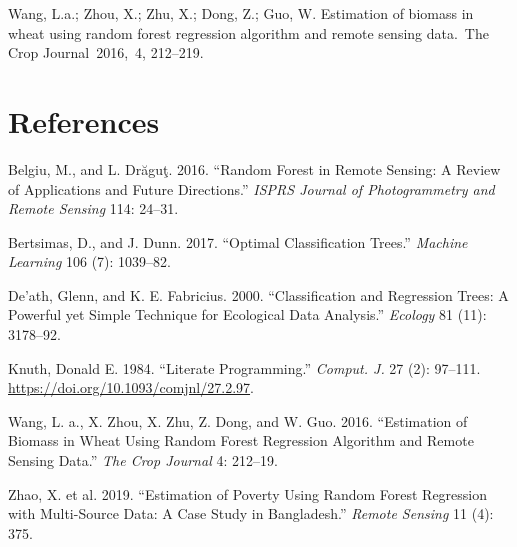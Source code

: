 \documentclass[
  letterpaper,
  DIV=11,
  numbers=noendperiod]{scrreprt}
\newlength{\cslhangindent}
\newenvironment{CSLReferences}[2] %
 {\begin{list}{}{%
  \setlength{\itemindent}{0pt}
  \setlength{\leftmargin}{0pt}
  \setlength{\parsep}{0pt}
  \ifodd #1
   \setlength{\leftmargin}{\cslhangindent}
   \setlength{\itemindent}{-1\cslhangindent}
  \fi
  \setlength{\itemsep}{#2\baselineskip}}}
 {\end{list}}
\begin{document}
Wang, L.a.; Zhou, X.; Zhu, X.; Dong, Z.; Guo, W. Estimation of biomass
in wheat using random forest regression algorithm and remote sensing
data.~The Crop Journal~2016,~4, 212--219.~


\chapter*{References}\label{references-1}


\label{refs}
\begin{CSLReferences}{1}{0}
Belgiu, M., and L. Drăguţ. 2016. {``Random Forest in Remote Sensing: A
Review of Applications and Future Directions.''} \emph{ISPRS Journal of
Photogrammetry and Remote Sensing} 114: 24--31.

Bertsimas, D., and J. Dunn. 2017. {``Optimal Classification Trees.''}
\emph{Machine Learning} 106 (7): 1039--82.

De'ath, Glenn, and K. E. Fabricius. 2000. {``Classification and
Regression Trees: A Powerful yet Simple Technique for Ecological Data
Analysis.''} \emph{Ecology} 81 (11): 3178--92.

Knuth, Donald E. 1984. {``Literate Programming.''} \emph{Comput. J.} 27
(2): 97--111. \url{https://doi.org/10.1093/comjnl/27.2.97}.

Wang, L. a., X. Zhou, X. Zhu, Z. Dong, and W. Guo. 2016. {``Estimation
of Biomass in Wheat Using Random Forest Regression Algorithm and Remote
Sensing Data.''} \emph{The Crop Journal} 4: 212--19.

Zhao, X. et al. 2019. {``Estimation of Poverty Using Random Forest
Regression with Multi-Source Data: A Case Study in Bangladesh.''}
\emph{Remote Sensing} 11 (4): 375.

\end{CSLReferences}
\end{document}
